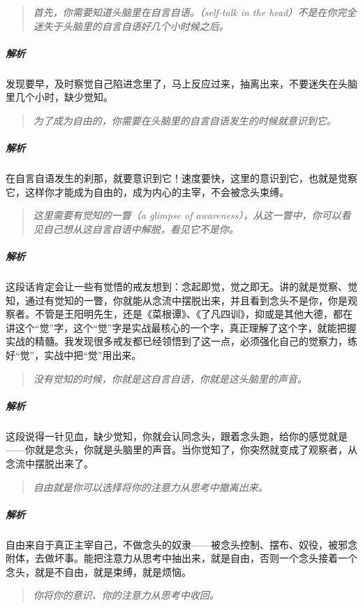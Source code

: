 \begin{quote}\it
    首先，你需要知道头脑里在自言自语。（self-talk in the head）不是在你完全迷失于头脑里的自言自语好几个小时候之后。
\end{quote}

\subparagraph{解析} 发现要早，及时察觉自己陷进念里了，马上反应过来，抽离出来，不要迷失在头脑里几个小时，缺少觉知。

\begin{quote}\it
    为了成为自由的，你需要在头脑里的自言自语发生的时候就意识到它。
\end{quote}

\subparagraph{解析} 在自言自语发生的刹那，就要意识到它！速度要快，这里的意识到它，也就是觉察它，这样你才能成为自由的，成为内心的主宰，不会被念头束缚。

\begin{quote}\it
    这里需要有觉知的一瞥（a glimpse of awareness），从这一瞥中，你可以看见自己想从这自言自语中解脱，看见它不是你。
\end{quote}

\subparagraph{解析} 这段话肯定会让一些有觉悟的戒友想到：念起即觉，觉之即无。讲的就是觉察、觉知，通过有觉知的一瞥，你就能从念流中摆脱出来，并且看到念头不是你，你是观察者。不管是王阳明先生，还是《菜根谭》、《了凡四训》，抑或是其他大德，都在讲这个“觉”字，这个“觉”字是实战最核心的一个字，真正理解了这个字，就能把握实战的精髓。我发现很多戒友都已经领悟到了这一点，必须强化自己的觉察力，练好“觉”，实战中把“觉”用出来。

\begin{quote}\it
    没有觉知的时候，你就是这自言自语，你就是这头脑里的声音。
\end{quote}

\subparagraph{解析} 这段说得一针见血，缺少觉知，你就会认同念头，跟着念头跑，给你的感觉就是——你就是念头，你就是头脑里的声音。当你觉知了，你突然就变成了观察者，从念流中摆脱出来了。

\begin{quote}\it
    自由就是你可以选择将你的注意力从思考中撤离出来。
\end{quote}

\subparagraph{解析} 自由来自于真正主宰自己，不做念头的奴隶——被念头控制、摆布、奴役，被邪念附体，去做坏事。能把注意力从思考中抽出来，就是自由，否则一个念头接着一个念头，就是不自由，就是束缚，就是烦恼。

\begin{quote}\it
    你将你的意识、你的注意力从思考中收回。
\end{quote}

